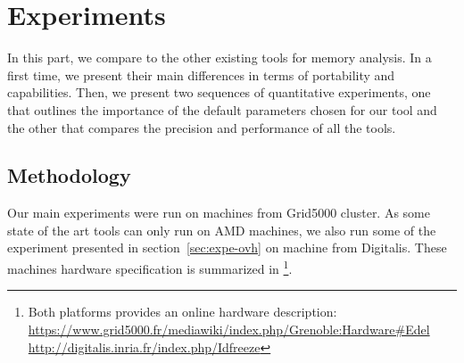 \section{Experiments}
\label{sec:expe}

In this part, we compare \Moca to the other existing tools for memory analysis. In a first time, we present their main differences in terms of portability
and capabilities. Then, we present two sequences of quantitative experiments, one that outlines the importance of the default parameters chosen for our tool
and the other that compares the precision and performance of all the tools.

\newpage

\subsection{Methodology}
\label{sec:exp-methodo}


Our main experiments were run on  machines from Grid5000 \Edel
cluster.
    As some state of the art tools can only run on AMD machines, we also run
    some of the experiment presented in section~\ref{sec:expe-ovh} on
    \Idfreeze machine from
    Digitalis.
    These machines hardware specification is summarized in
    \footnote{Both platforms provides an online hardware description:\\
        \url{https://www.grid5000.fr/mediawiki/index.php/Grenoble:Hardware\#Edel}
     \\\url{http://digitalis.inria.fr/index.php/Idfreeze}}.

